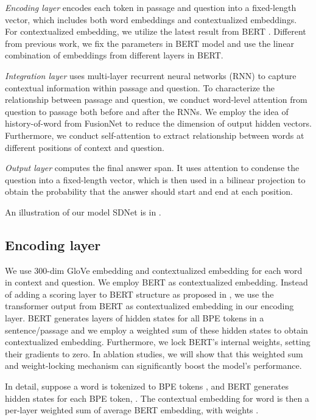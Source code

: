 \documentclass{article} \usepackage{sdnet,times}
\begin{document}
\textit{Encoding layer} encodes each token in passage and question into a fixed-length vector, which includes both word embeddings and contextualized embeddings. For contextualized embedding, we utilize the latest result from BERT \citep{bert}. Different from previous work, we fix the parameters in BERT model and use the linear combination of embeddings from different layers in BERT.

\textit{Integration layer} uses multi-layer recurrent neural networks (RNN) to capture contextual information within passage and question. To characterize the relationship between passage and question, we conduct word-level attention from question to passage both before and after the RNNs. We employ the idea of history-of-word from FusionNet \citep{fusionnet} to reduce the dimension of output hidden vectors. Furthermore, we conduct self-attention to extract relationship between words at different positions of context and question.

\textit{Output layer} computes the final answer span. It uses attention to condense the question into a fixed-length vector, which is then used in a bilinear projection to obtain the probability that the answer should start and end at each position. 

An illustration of our model SDNet is in .

\subsection{Encoding layer} 
We use 300-dim GloVe \citep{pennington2014glove} embedding and contextualized embedding for each word in context and question. We employ BERT \citep{bert} as contextualized embedding. Instead of adding a scoring layer to BERT structure as proposed in \citep{bert}, we use the transformer output from BERT as contextualized embedding in our encoding layer. BERT generates  layers of hidden states for all BPE tokens \citep{bpe} in a sentence/passage and we employ a weighted sum of these hidden states to obtain contextualized embedding. Furthermore, we lock BERT's internal weights, setting their gradients to zero. In ablation studies, we will show that this weighted sum and weight-locking mechanism can significantly boost the model's performance.

In detail, suppose a word  is tokenized to  BPE tokens , and BERT generates  hidden states for each BPE token, . The contextual embedding  for word  is then a per-layer weighted sum of average BERT embedding, with weights .
\end{document}
